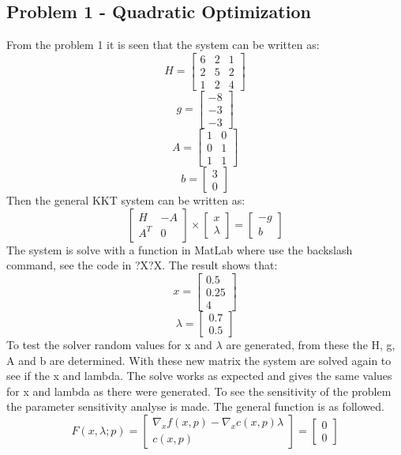 \subsection{Problem 1 - Quadratic Optimization}
From the problem 1 it is seen that the system can be written as:
\[H=\begin{bmatrix}
	6 & 2 & 1 \\2 & 5 & 2 \\1 & 2 & 4
\end{bmatrix}\]
\[g=\begin{bmatrix}
	-8 \\-3 \\ -3
\end{bmatrix}\]
\[A=\begin{bmatrix}
	1 & 0 \\ 0 & 1 \\ 1 & 1
\end{bmatrix}\]
\[b= \begin{bmatrix}
	3 \\ 0
\end{bmatrix}\]
Then the general KKT system can be written as:
\[\begin{bmatrix}
	H & -A \\A^T & 0
\end{bmatrix} \times \begin{bmatrix}
	x\\ \lambda
\end{bmatrix} =\begin{bmatrix}
	-g\\ b
\end{bmatrix}\]
The system is solve with a function in MatLab where use the backslash command, see the code in ?X?X. The result shows that:
\[x=\begin{bmatrix}
	0.5 \\ 0.25 \\ 4
\end{bmatrix}\]
\[\lambda=\begin{bmatrix}
	0.7 \\0.5 
\end{bmatrix}\]
To test the solver random values for x and $\lambda$ are generated, from these the H, g, A and b are determined. With these new matrix the system are solved again to see if the x and lambda. The solve works as expected and gives the same values for x and lambda as there were generated.
To see the sensitivity of the problem the parameter sensitivity analyse is made. The general function is as followed. 
\[F(x,\lambda;p)= \begin{bmatrix}
	\nabla_x f(x,p)- \nabla_x c(x,p)\lambda \\ c(x,p)
\end{bmatrix}=\begin{bmatrix}
0 \\ 0
\end{bmatrix}\]
